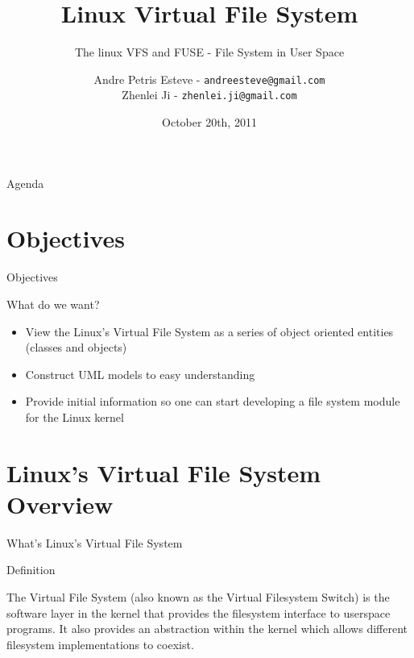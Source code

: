 \documentclass{beamer}
\author[Andre Esteve and Zhenlei Ji]{
Andre Petris Esteve - \texttt{andreesteve@gmail.com}\\
Zhenlei Ji - \texttt{zhenlei.ji@gmail.com}}
\institute[IC\textbackslash UNICAMP]{
MC806 - Operational System Topics\\}
\title[Linux VFS]{Linux Virtual File System}
\subtitle[]{The linux VFS and FUSE - File System in User Space}
\date[10/20/2011]{October 20th, 2011}
\begin{document}

\begin{frame}[plain]
  \titlepage
\end{frame}

\begin{frame}{Agenda}
  \tableofcontents
\end{frame}

\section{Objectives}

\begin{frame}{Objectives}

  \begin{block}{What do we want?}

	\begin{itemize}

		\item{View the Linux's Virtual File System as a series of object oriented entities (classes and objects)}

		\item{Construct UML models to easy understanding}
		
		\item{Provide initial information so one can start developing a file system module for the Linux kernel}
	
	\end{itemize}

  \end{block}

\end{frame}

\section{Linux's Virtual File System Overview}

\begin{frame}{What's Linux's Virtual File System}

  \begin{block}{Definition}

	The Virtual File System (also known as the Virtual Filesystem Switch)
	is the software layer in the kernel that provides the filesystem
	interface to userspace programs. It also provides an abstraction
	within the kernel which allows different filesystem implementations to
	coexist. \footnotemark

  \end{block}


\end{frame}
\end{document}

